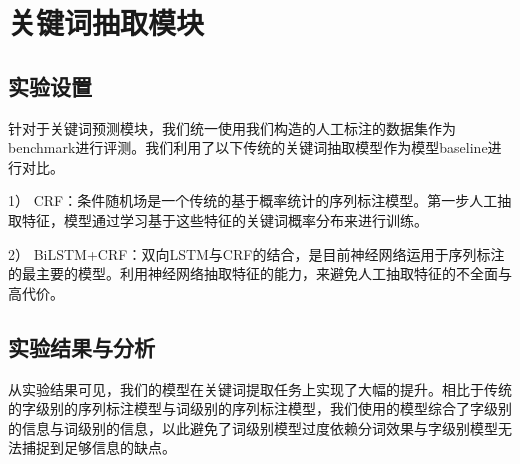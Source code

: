 \section{关键词抽取模块}
\subsection{实验设置}

针对于关键词预测模块，我们统一使用我们构造的人工标注的数据集作为benchmark进行评测。我们利用了以下传统的关键词抽取模型作为模型baseline进行对比。

1）	CRF：条件随机场是一个传统的基于概率统计的序列标注模型。第一步人工抽取特征，模型通过学习基于这些特征的关键词概率分布来进行训练。

2）	BiLSTM+CRF：双向LSTM与CRF的结合，是目前神经网络运用于序列标注的最主要的模型。利用神经网络抽取特征的能力，来避免人工抽取特征的不全面与高代价。


\subsection{实验结果与分析}

从实验结果可见，我们的模型在关键词提取任务上实现了大幅的提升。相比于传统的字级别的序列标注模型与词级别的序列标注模型，我们使用的模型综合了字级别的信息与词级别的信息，以此避免了词级别模型过度依赖分词效果与字级别模型无法捕捉到足够信息的缺点。


